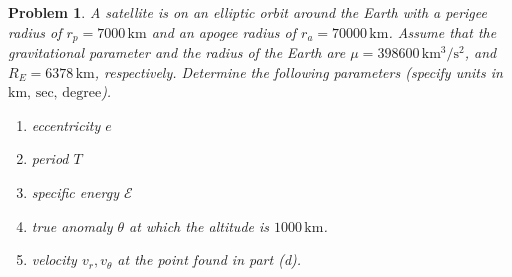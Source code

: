 \documentclass[10pt]{article}
\theoremstyle{plain}\theorembodyfont{\normalfont}
\newtheorem{prob}{Problem}[section]
\newenvironment{subprob}%
{\renewcommand{\theenumi}{\alph{enumi}}\renewcommand{\labelenumi}{(\theenumi)}\begin{enumerate}}%
{\end{enumerate}}%
\begin{document}
\begin{prob}
A satellite is on an elliptic orbit around the Earth with a perigee radius of $r_p=7000\,\mathrm{km}$ and an apogee radius of $r_a=70000\,\mathrm{km}$. Assume that the gravitational parameter and the radius of the Earth are $\mu=398600\,\mathrm{km^3/s^2}$, and $R_E=6378\,\mathrm{km}$, respectively. Determine the following parameters (specify units in $\mathrm{km},\,\mathrm{sec},\,\mathrm{degree}$). 
\begin{subprob}
\item eccentricity $e$
\item period $T$ 
\item specific energy $\mathcal{E}$
\item true anomaly $\theta$ at which the altitude is $1000\,\mathrm{km}$.
\item velocity $v_r,v_\theta$ at the point found in part (d).
\end{subprob}
\end{prob}

%
\end{document}
